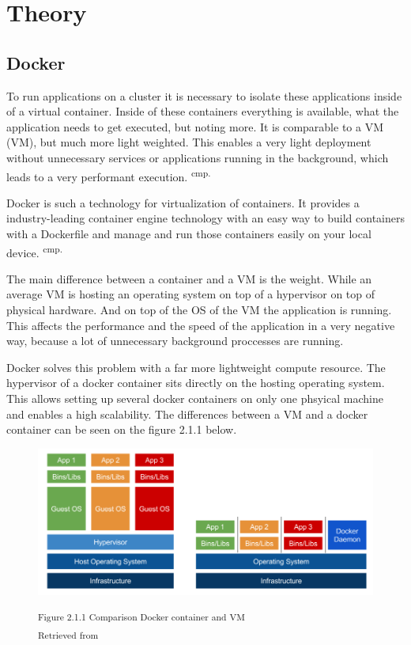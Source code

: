 \chapter{Theory}

\section{Docker} 

To run applications on a cluster it is necessary to isolate these applications inside of a virtual container. Inside of these containers everything is available, what the application needs to get executed, but noting more. It is comparable to a \acs{VM} (\acl{VM}), but much more light weighted. This enables a very light deployment without unnecessary services or applications running in the background, which leads to a very performant execution. \textsuperscript{cmp.\cite{11}}


Docker is such a technology for virtualization of containers. It provides a industry-leading container engine technology with an easy way to build containers with a Dockerfile and manage and run those containers easily on your local device. \textsuperscript{cmp.\cite{12}}


The main difference between a container and a VM is the weight. While an average VM is hosting an operating system on top of a hypervisor on top of physical hardware. And on top of the OS of the VM the application is running. This affects the performance and the speed of the application in a very negative way, because a lot of unnecessary background proccesses are running. 

Docker solves this problem with a far more lightweight compute resource. The hypervisor of a docker container sits directly on the hosting operating system. This allows setting up several docker containers on only one phsyical machine and enables a high scalability. The differences between a VM and a docker container can be seen on the figure 2.1.1 below.

\begin{figure}[h]
\centering
\includegraphics[width=\textwidth/5*4]{images/docker_vm_differences.png}

\textsuperscript{Figure 2.1.1 Comparison Docker container and VM}\\
\textsuperscript{Retrieved from \cite{13}}
\end{figure}

